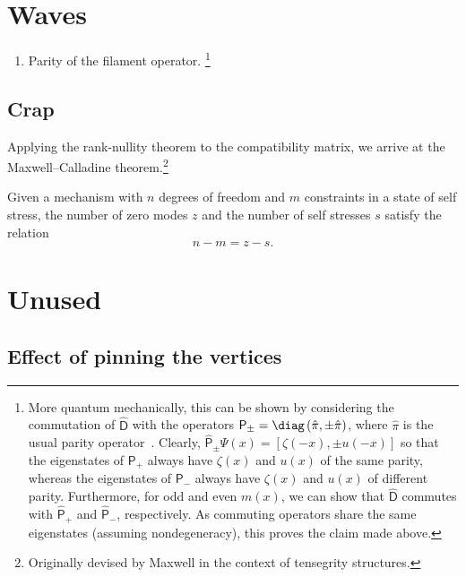 \section{Waves}

\begin{enumerate}
  \item Parity of the filament operator.%
    \footnote{%
    More quantum mechanically, this can be shown by considering the commutation of $\widehat{\mathsf{D}}$ with the operators $\mathsf{P}_{\pm} = \diag\left(\hat{\pi}, \pm\hat{\pi}\right)$, where $\hat{\pi}$ is the usual parity operator~\cite{cohen-tannoudji2019}.
      Clearly, $\widehat{\mathsf{P}}_{\pm}\Psi(x) = \left[\zeta(-x), \pm u(-x)\right]$ so that
      the eigenstates of $\mathsf{P}_{+}$ always have $\zeta(x)$ and $u(x)$ of the same parity, whereas the eigenstates of $\mathsf{P}_{-}$ always have $\zeta(x)$ and $u(x)$ of different parity.
      Furthermore, for odd and even $m(x)$, we can show that $\widehat{\mathsf{D}}$ commutes with $\widehat{\mathsf{P}}_{+}$ and $\widehat{\mathsf{P}}_{-}$, respectively.
      As commuting operators share the same eigenstates (assuming nondegeneracy), this proves the claim made above.%
    }
\end{enumerate}

\subsection{Crap}

Applying the rank-nullity theorem to the compatibility matrix, we arrive at the Maxwell--Calladine theorem.\footnote{Originally devised by Maxwell in the context of tensegrity structures.}
%
\begin{theorem}
  Given a mechanism with $n$ degrees of freedom and $m$ constraints in a state of self stress, the number of zero modes $z$ and the number of self stresses $s$ satisfy the relation
  \begin{equation*}
    n - m = z - s.
  \end{equation*}
\end{theorem}

\section{Unused}

\subsection{Effect of pinning the vertices}


